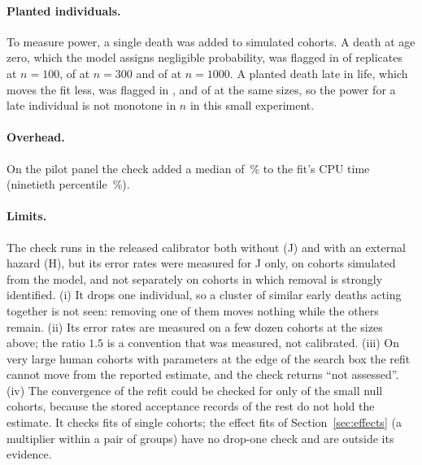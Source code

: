 \paragraph{Planted individuals.} To measure power, a single death was added to simulated cohorts. A death at age zero, which
the model assigns negligible probability, was flagged in  of  replicates at
$n=100$,  of  at $n=300$ and  of  at $n=1000$.
A planted death late in life, which moves the fit less, was flagged in ,  and
 of  at the same sizes, so the power for a late individual is not monotone in $n$ in
this small experiment.

\paragraph{Overhead.} On the pilot panel the check added a median of \,\% to the fit's CPU time
(ninetieth percentile \,\%).

\paragraph{Limits.} The check runs in the released calibrator both without (J) and with an external hazard (H), but its error rates were measured
for J only, on cohorts simulated from the model, and not separately on cohorts in which removal is strongly identified. (i) It drops one individual, so a cluster of similar early deaths acting together is not seen:
removing one of them moves nothing while the others remain. (ii) Its error rates are measured on a few dozen cohorts at the sizes above;
the ratio $1.5$ is a convention that was measured, not calibrated. (iii) On very large human cohorts with parameters at the
edge of the search box the refit cannot move from the reported estimate, and the check returns ``not assessed''.
(iv) The convergence of the refit could be checked for only  of the  small null cohorts,
because the stored acceptance records of the rest do not hold the estimate. %
It checks fits of single cohorts; the effect fits of Section~\ref{sec:effects} (a multiplier within a pair of groups) have no drop-one check and are outside its evidence.
